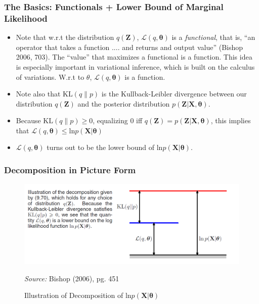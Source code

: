 \documentclass{beamer}
\begin{document}
\begin{frame}
\frametitle{The Basics: Functionals + Lower Bound of Marginal Likelihood}
\begin{itemize}
	\item Note that w.r.t the distribution $q(\mathbf{Z})$, $\mathcal{L}(q, \boldsymbol{\theta})$ is a \textit{functional}, that is, ``an operator that takes a function .... and returns and output value'' (Bishop 2006, 703). The ``value'' that maximizes a functional is a function. This idea is especially important in variational inference, which is built on the calculus of variations. W.r.t to $\theta$, $\mathcal{L}(q, \boldsymbol{\theta})$ is a function. 
	\item Note also that $\text{KL}(q\|p)$ is the Kullback-Leibler divergence between our distribution $q(\mathbf{Z})$ and the posterior distribution $p(\mathbf{Z}|\mathbf{X}, \boldsymbol{\theta})$.
	\item Because $\text{KL}(q\|p) \geq 0$, equalizing $0$ iff $q(\mathbf{Z}) = p(\mathbf{Z}|\mathbf{X}, \boldsymbol{\theta})$, this implies that $\mathcal{L}(q, \boldsymbol{\theta}) \leq \text{ln}p(\mathbf{X}|\boldsymbol{\theta})$
	\item $\mathcal{L}(q, \boldsymbol{\theta})$ turns out to be the lower bound of 		$\text{ln}p(\mathbf{X}|\boldsymbol{\theta})$.  
\end{itemize}

\end{frame}

\begin{frame}
\frametitle{Decomposition in Picture Form}
 \begin{figure}
	\centering
	\includegraphics[width=0.7\linewidth]{decomposition}
	\caption{Illustration of Decomposition of $	\text{ln}p(\mathbf{X}|\boldsymbol{\theta})$}
	
	\textit{Source:} Bishop (2006), pg. 451
	\label{fig:decomposition}
\end{figure}
\end{frame}
\end{document}
